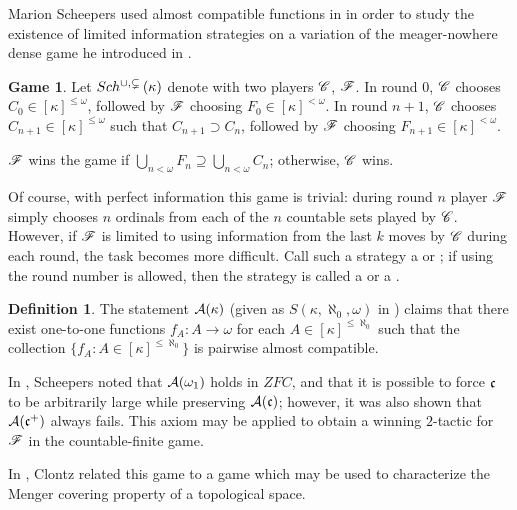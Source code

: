 \documentclass{amsart}
\theoremstyle{plain}
\theoremstyle{definition}
\newtheorem{definition}[theorem]{Definition}
\newtheorem{game}[theorem]{Game}
\theoremstyle{remark}
\theoremstyle{plain}
\theoremstyle{definition}
\theoremstyle{remark}
\begin{document}
  Marion Scheepers used almost compatible functions in \cite{MR1129143} in order
  to study the existence of limited information strategies on a variation
  of the meager-nowhere dense game he introduced in \cite{MR1183703}.

  \begin{game}
    Let \(Sch^{\cup,\subsetneq}\left({\kappa}\right)\) denote
    with two players \(\mathscr{C}\), \(\mathscr{F}\). In round \(0\), \(\mathscr{C}\) chooses
    \(C_0\in[\kappa]^{\leq\omega}\), followed by \(\mathscr{F}\) choosing
    \(F_0\in[\kappa]^{<\omega}\). In round \(n+1\), \(\mathscr{C}\) chooses
    \(C_{n+1}\in[\kappa]^{\leq\omega}\) such that \(C_{n+1}\supset C_n\), followed
    by \(\mathscr{F}\) choosing \(F_{n+1}\in[\kappa]^{<\omega}\).

    \(\mathscr{F}\) wins the game if
    \(\bigcup_{n<\omega} F_n\supseteq\bigcup_{n<\omega} C_n\); otherwise,
    \(\mathscr{C}\) wins.
  \end{game}

  Of course, with perfect information this game is trivial: during round
  \(n\) player \(\mathscr{F}\) simply chooses \(n\) ordinals from each of the
  \(n\) countable sets played by \(\mathscr{C}\). However, if \(\mathscr{F}\) is limited
  to using information from the last \(k\) moves by \(\mathscr{C}\) during each
  round, the task becomes more difficult. Call such a strategy a
   or ; if using the round
  number is allowed, then the strategy is called a 
  or a .

  \begin{definition}
    The statement \(\mathcal{A}(\kappa)\) (given as \(S(\kappa,\aleph_0,\omega)\)
    in \cite{MR1129143})
    claims that there exist one-to-one functions
    \(f_A:A\to\omega\) for each \(A\in[\kappa]^{\leq\aleph_0}\) such that
    the collection \(\{f_A:A\in[\kappa]^{\leq\aleph_0}\}\) is pairwise
    almost compatible.
  \end{definition}

  In \cite{MR1129143}, Scheepers noted that \(\mathcal{A}(\omega_1)\) holds in \(ZFC\),
  and that it is possible to force \(\mathfrak{c}\) to be arbitrarily large
  while preserving \(\mathcal{A}(\mathfrak{c})\); however,
  it was also shown that \(\mathcal{A}(\mathfrak{c}^+)\) always fails.
  This axiom may be applied to obtain a winning \(2\)-tactic for \(\mathscr{F}\)
  in the countable-finite game.

  In \cite{clontzMengerGamePreprint}, Clontz related this game to a game
  which may be used to characterize the Menger covering property of a
  topological space.
\end{document}
